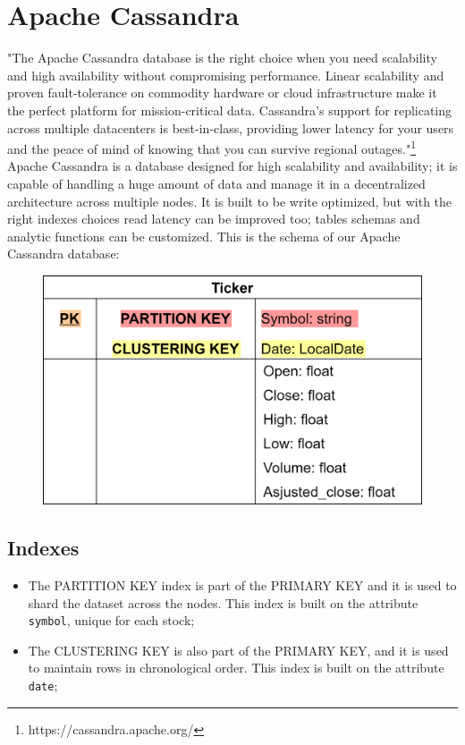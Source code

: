 \section{Apache Cassandra}
"The Apache Cassandra database is the right choice when you need scalability and
high availability without compromising performance. Linear scalability and
proven fault-tolerance on commodity hardware or cloud infrastructure make it the
perfect platform for mission-critical data. Cassandra's support for replicating
across multiple datacenters is best-in-class, providing lower latency for your
users and the peace of mind of knowing that you can survive regional outages."\footnote{https://cassandra.apache.org/}\\
Apache Cassandra is a database designed for high scalability and availability;
it is capable of handling a huge amount of data and manage it in a decentralized
architecture across multiple nodes. It is built to be write optimized, but with
the right indexes choices read latency can be improved too; tables schemas and
analytic functions can be customized. This is the schema of our Apache Cassandra
database:
\begin{figure}[H]
	\begin{center}
		\includegraphics[scale=0.2]{img/cassandraDB_scheme.png}
	\end{center}
\end{figure}
\subsection{Indexes}
\begin{itemize}
    \item The PARTITION KEY index is part of the PRIMARY KEY and it is used to
    shard the dataset across the nodes. This index is built on the attribute
    \texttt{symbol}, unique for each stock;
    \item The CLUSTERING KEY is also part of the PRIMARY KEY, and it is used to
    maintain rows in chronological order. This index is built on the attribute
    \texttt{date};
\end{itemize}
